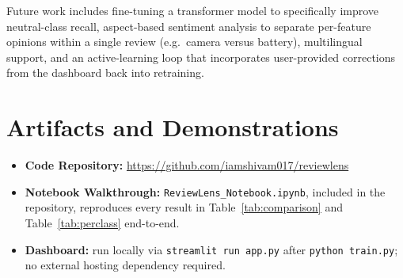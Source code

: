 \documentclass{article}
\begin{document}
Future work includes fine-tuning a transformer model to specifically
improve neutral-class recall, aspect-based sentiment analysis to separate
per-feature opinions within a single review (e.g.\ camera versus battery),
multilingual support, and an active-learning loop that incorporates
user-provided corrections from the dashboard back into retraining.

\section{Artifacts and Demonstrations}

\begin{itemize}[noitemsep]
    \item \textbf{Code Repository:} \url{https://github.com/iamshivam017/reviewlens}
    \item \textbf{Notebook Walkthrough:} \texttt{ReviewLens\_Notebook.ipynb},
    included in the repository, reproduces every result in Table~\ref{tab:comparison}
    and Table~\ref{tab:perclass} end-to-end.
    \item \textbf{Dashboard:} run locally via \texttt{streamlit run app.py}
    after \texttt{python train.py}; no external hosting dependency required.
\end{itemize}
\end{document}
